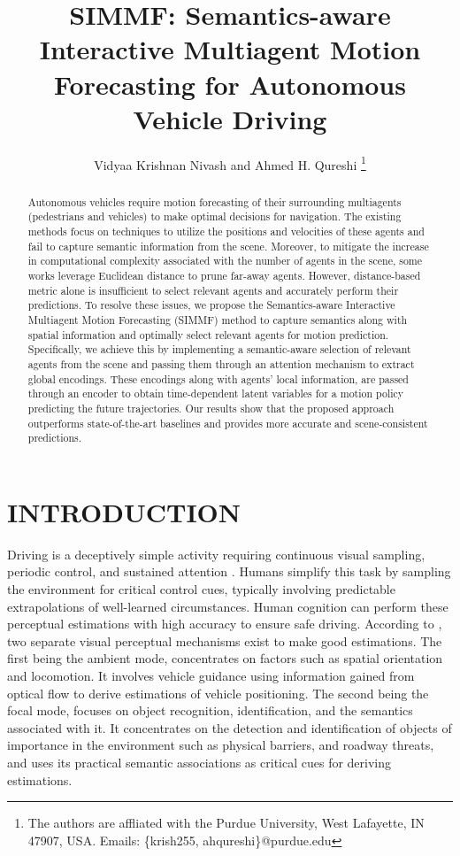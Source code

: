 \documentclass[letterpaper, 10 pt, conference]{ieeeconf}  %
\title{\LARGE \bf
SIMMF: Semantics-aware Interactive Multiagent Motion Forecasting for Autonomous Vehicle Driving
}
\author{Vidyaa Krishnan Nivash and Ahmed H. Qureshi%
\thanks{The authors are affliated with the Purdue University, West Lafayette, IN 47907, USA. Emails: \{krish255, ahqureshi\}@purdue.edu}
}
\begin{document}
\maketitle
\thispagestyle{empty}
\pagestyle{empty}

\begin{abstract}

Autonomous vehicles require motion forecasting of their surrounding multiagents (pedestrians and vehicles) to make optimal decisions for navigation. The existing methods focus on techniques to utilize the positions and velocities of these agents and fail to capture semantic information from the scene. Moreover, to mitigate the increase in computational complexity associated with the number of agents in the scene, some works leverage Euclidean distance to prune far-away agents. However, distance-based metric alone is insufficient to select relevant agents and accurately perform their predictions. To resolve these issues, we propose the Semantics-aware Interactive Multiagent Motion Forecasting (SIMMF) method to capture semantics along with spatial information and optimally select relevant agents for motion prediction. Specifically, we achieve this by implementing a semantic-aware selection of relevant agents from the scene and passing them through an attention mechanism to extract global encodings. These encodings along with agents' local information, are passed through an encoder to obtain time-dependent latent variables for a motion policy predicting the future trajectories.  Our results show that the proposed approach outperforms state-of-the-art baselines and provides more accurate and scene-consistent predictions. 

\end{abstract}


\section{INTRODUCTION}

Driving is a deceptively simple activity requiring continuous visual sampling, periodic control, and sustained attention \cite{CASTRO}. Humans simplify this task by sampling the environment for critical control cues, typically involving predictable extrapolations of well-learned circumstances. Human cognition can perform these perceptual estimations with high accuracy to ensure safe driving. According to \cite{Tyrrell}, two separate visual perceptual mechanisms exist to make good estimations. The first being the ambient mode, concentrates on factors such as spatial orientation and locomotion. It involves vehicle guidance using information gained from optical flow to derive estimations of vehicle positioning. The second being the focal mode, focuses on object recognition, identification, and the semantics associated with it. It concentrates on the detection and identification of objects of importance in the environment such as physical barriers, and roadway threats, and uses its practical semantic associations as critical cues for deriving estimations. 
\end{document}
